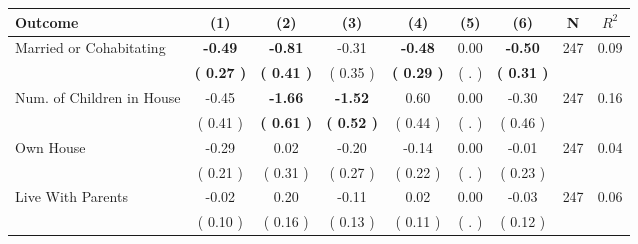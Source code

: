 \begin{tabular}{lcccccccc}
\toprule
 \textbf{Outcome} & \textbf{(1)} & \textbf{(2)} & \textbf{(3)} & \textbf{(4)} & \textbf{(5)} & \textbf{(6)} & \textbf{N} & \textbf{$ R^2$} \\
\midrule
Married or Cohabitating & \textbf{    -0.49} & \textbf{    -0.81} &     -0.31 & \textbf{    -0.48} &      0.00 & \textbf{    -0.50} & 247 &       0.09 \\ 
 & \textbf{(     0.27 )} & \textbf{(     0.41 )} & (     0.35 ) & \textbf{(     0.29 )} & (        . ) & \textbf{(     0.31 )} & \\
Num. of Children in House &     -0.45 & \textbf{    -1.66} & \textbf{    -1.52} &      0.60 &      0.00 &     -0.30 & 247 &       0.16 \\ 
 & (     0.41 ) & \textbf{(     0.61 )} & \textbf{(     0.52 )} & (     0.44 ) & (        . ) & (     0.46 ) & \\
Own House &     -0.29 &      0.02 &     -0.20 &     -0.14 &      0.00 &     -0.01 & 247 &       0.04 \\ 
 & (     0.21 ) & (     0.31 ) & (     0.27 ) & (     0.22 ) & (        . ) & (     0.23 ) & \\
Live With Parents &     -0.02 &      0.20 &     -0.11 &      0.02 &      0.00 &     -0.03 & 247 &       0.06 \\ 
 & (     0.10 ) & (     0.16 ) & (     0.13 ) & (     0.11 ) & (        . ) & (     0.12 ) & \\
\bottomrule
\end{tabular}
